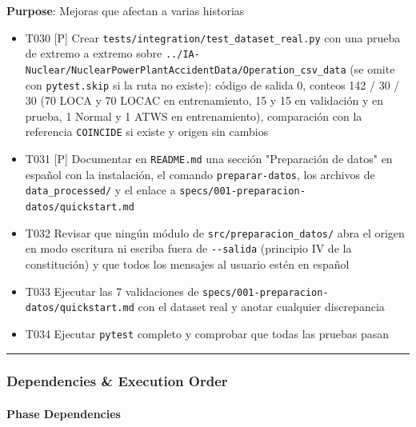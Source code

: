 \documentclass[12pt,a4paper]{article}
\providecommand{\tightlist}{\setlength{\itemsep}{0pt}\setlength{\parskip}{0pt}}
\newenvironment{documentogenerado}[2]{%
  \def\doccomando{#1}\def\docruta{#2}%
  \par\begingroup\small\setstretch{1.15}\sloppy%
}{\endgroup\par\medskip}
\begin{document}
\begin{documentogenerado}{/speckit-tasks (fase 7: /speckit-converge)}{specs\slash 001-preparacion-datos\slash tasks.md}
\textbf{Purpose}: Mejoras que afectan a varias historias

\begin{itemize}
\tightlist
\item[$\boxtimes$]
  T030 {[}P{]} Crear \texttt{tests/\allowbreak{}integration/\allowbreak{}test\_\allowbreak{}dataset\_\allowbreak{}real.\allowbreak{}py} con una prueba de extremo a extremo sobre \texttt{.\allowbreak{}.\allowbreak{}/\allowbreak{}IA-\allowbreak{}Nuclear/\allowbreak{}NuclearPowerPlantAccidentData/\allowbreak{}Operation\_\allowbreak{}csv\_\allowbreak{}data} (se omite con \texttt{pytest.\allowbreak{}skip} si la ruta no existe): código de salida 0, conteos 142 / 30 / 30 (70 LOCA y 70 LOCAC en entrenamiento, 15 y 15 en validación y en prueba, 1 Normal y 1 ATWS en entrenamiento), comparación con la referencia \texttt{COINCIDE} si existe y origen sin cambios
\item[$\boxtimes$]
  T031 {[}P{]} Documentar en \texttt{README.\allowbreak{}md} una sección "Preparación de datos" en español con la instalación, el comando \texttt{preparar-\allowbreak{}datos}, los archivos de \texttt{data\_\allowbreak{}processed/} y el enlace a \texttt{specs/\allowbreak{}001-\allowbreak{}preparacion-\allowbreak{}datos/\allowbreak{}quickstart.\allowbreak{}md}
\item[$\boxtimes$]
  T032 Revisar que ningún módulo de \texttt{src/\allowbreak{}preparacion\_\allowbreak{}datos/} abra el origen en modo escritura ni escriba fuera de \texttt{-\allowbreak{}\/\allowbreak{}-\allowbreak{}salida} (principio IV de la constitución) y que todos los mensajes al usuario estén en español
\item[$\boxtimes$]
  T033 Ejecutar las 7 validaciones de \texttt{specs/\allowbreak{}001-\allowbreak{}preparacion-\allowbreak{}datos/\allowbreak{}quickstart.\allowbreak{}md} con el dataset real y anotar cualquier discrepancia
\item[$\boxtimes$]
  T034 Ejecutar \texttt{pytest} completo y comprobar que todas las pruebas pasan
\end{itemize}

\begin{center}\rule{0.5\linewidth}{0.5pt}\end{center}

\subsubsection{Dependencies \& Execution Order}

\paragraph{Phase Dependencies}


\end{documentogenerado}
\end{document}
